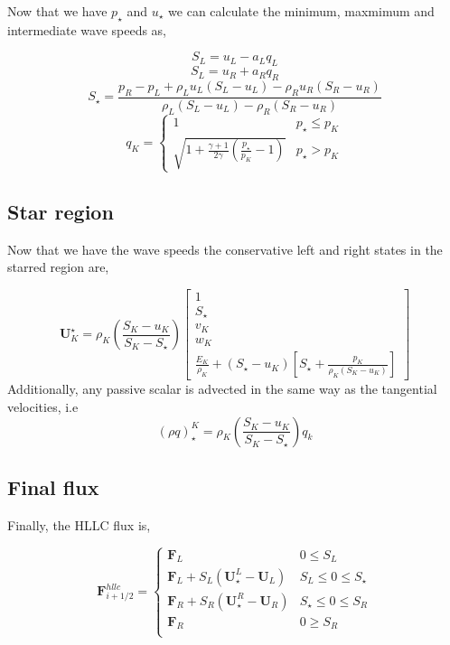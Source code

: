 \documentclass{article}
\begin{document}
Now that we have $p_\star$ and $u_\star$ we can calculate the minimum, maxmimum and intermediate wave speeds as,

\begin{equation}
S_L = u_L - a_L q_L
\end{equation}
\begin{equation}
S_L = u_R + a_R q_R
\end{equation}
\begin{equation}
S_\star = \frac{ p_R - p_L + \rho_L u_L (S_L - u_L) - \rho_R u_R (S_R - u_R)}{\rho_L (S_L - u_L) - \rho_R (S_R - u_R)}
\end{equation}
\begin{equation}
q_K = 
\begin{cases}
1 & p_\star \le p_K \\
\sqrt{ 1 + \frac{\gamma +1}{2 \gamma}\left( \frac{p_\star}{p_K} - 1 \right)} & p_\star > p_K
\end{cases}
\end{equation}

\subsection{Star region}
Now that we have the wave speeds the conservative left and right states in the starred region are,

\begin{equation}
\mathbf{U}_K^\star = \rho_K \left( \frac{ S_K - u_K}{S_K - S_\star} \right) \left[
\begin{matrix}
1 \\ 
S_\star \\
v_K \\
w_K \\
\frac{E_K}{\rho_K} + (S_\star - u_K) \left[ S_\star  + \frac{p_K}{\rho_K(S_K-u_K)} \right]
\end{matrix}
\right]
\end{equation}
Additionally, any passive scalar is advected in the same way as the tangential velocities, i.e
\begin{equation}
(\rho q)_\star^K = \rho_K \left( \frac{S_K - u_K}{S_K - S_\star} \right) q_k
\end{equation}


\subsection{Final flux}

Finally, the HLLC flux is,

\begin{equation}
\mathbf{F}_{i+1/2}^{hllc} = 
\begin{cases}
\mathbf{F}_L & 0 \le S_L \\
\mathbf{F}_L + S_L(\mathbf{U}_\star^L - \mathbf{U}_L) & S_L \le 0 \le S_\star \\
\mathbf{F}_R + S_R(\mathbf{U}_\star^R - \mathbf{U}_R) & S_\star \le 0 \le S_R \\
\mathbf{F}_R & 0 \ge S_R \\
\end{cases}
\end{equation}
\end{document}
